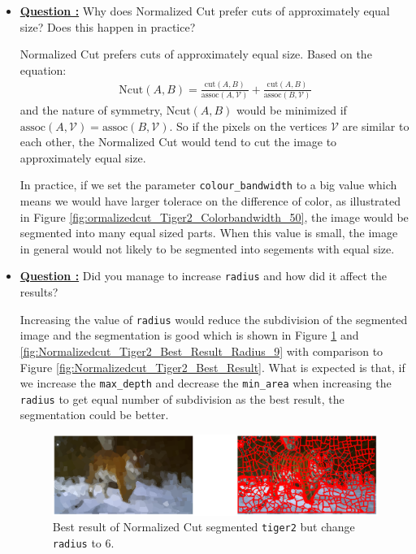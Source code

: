 \documentclass[11pt,a4paper]{article}
\begin{document}
\begin{itemize}
	\item\addtocounter{Counter}{1}\underline{\textbf{Question :}} Why does Normalized Cut prefer cuts of approximately equal size? Does this happen in practice?
		\par Normalized Cut prefers cuts of approximately equal size. Based on the equation:
		\begin{align*}
			\mathrm{Ncut}(A,B) = \frac{\mathrm{cut}(A,B)}{\mathrm{assoc}(A,\mathcal{V})} + \frac{\mathrm{cut}(A,B)}{\mathrm{assoc}(B,\mathcal{V})}
		\end{align*}
		and the nature of symmetry, $\mathrm{Ncut}(A,B)$ would be minimized if $\mathrm{assoc}(A,\mathcal{V}) = \mathrm{assoc}(B,\mathcal{V})$. So if the pixels on the vertices $\mathcal{V}$ are similar to each other, the Normalized Cut would tend to cut the image to approximately equal size.
		\par In practice, if we set the parameter \texttt{colour\_bandwidth} to a big value which means we would have larger tolerace on the difference of color, as illustrated in Figure \ref{fig:ormalizedcut_Tiger2_Colorbandwidth_50}, the image would be segmented into many equal sized parts. When this value is small, the image in general would not likely to be segmented into segements with equal size.
	
	\item\addtocounter{Counter}{1}\underline{\textbf{Question :}} Did you manage to increase \texttt{radius} and how did it affect the results?
		\par Increasing the value of \texttt{radius} would reduce the subdivision of the segmented image and the segmentation is good which is shown in Figure \ref{fig:Normalizedcut_Tiger2_Best_Result_Radius_6} and \ref{fig:Normalizedcut_Tiger2_Best_Result_Radius_9} with comparison to Figure \ref{fig:Normalizedcut_Tiger2_Best_Result}. What is expected is that, if we increase the \texttt{max\_depth} and decrease the \texttt{min\_area} when increasing the \texttt{radius} to get equal number of subdivision as the best result, the segmentation could be better.
		\begin{figure}[!ht]
			\centering
			\includegraphics[width=\columnwidth]{Figure/Normalizedcut_Tiger2_Best_Result_Radius_6.eps}
			\caption{Best result of Normalized Cut segmented \texttt{tiger2} but change \texttt{radius} to 6.}
			\label{fig:Normalizedcut_Tiger2_Best_Result_Radius_6}
		\end{figure}
		

\end{itemize}
\end{document}
